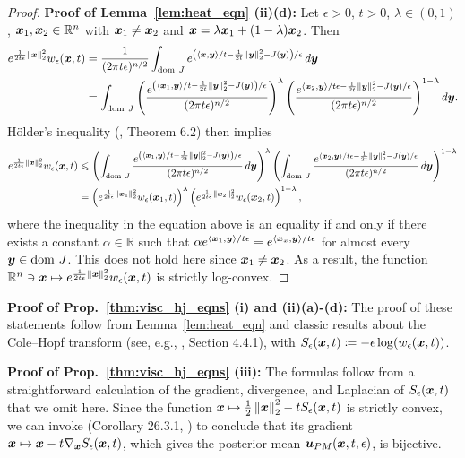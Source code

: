 \begin{proof}
\textbf{Proof of Lemma~\ref{lem:heat_eqn} (ii)(d):} Let $\epsilon>0$, $t>0$, $\lambda\in(0,1)$, $\boldsymbol{x}_1,\boldsymbol{x}_2\in \mathbb{R}^n$ with $\boldsymbol{x}_1\neq\boldsymbol{x}_2$ and $\boldsymbol{x}=\lambda\boldsymbol{x}_{1}+(1-\lambda)\boldsymbol{x}_{2}$. Then
\begin{align*}
    e^{\frac{1}{2t\epsilon}\left\Vert{\boldsymbol{x}} \right\Vert_{2}^{2}}w_\epsilon(\boldsymbol{x},t) &= \frac{1}{(2\pi t\epsilon)^{n/2}}\int_{\mathrm{dom~} J} e^{\left(\left\langle \boldsymbol{x},\boldsymbol{y}\right\rangle/t -\frac{1}{2t}\left\Vert{\boldsymbol{y}} \right\Vert_{2}^{2} - J(\boldsymbol{y})\right)/\epsilon}\mathop{}\!d\boldsymbol{y} \\
    &=\int_{\mathrm{dom~} J} \left(\frac{e^{\left(\left\langle \boldsymbol{x}_1,\boldsymbol{y}\right\rangle/t-\frac{1}{2t}\left\Vert{\boldsymbol{y}} \right\Vert_{2}^{2} - J(\boldsymbol{y})\right)/\epsilon}}{(2\pi t \epsilon)^{n/2}}\right)^\lambda \left(\frac{e^{\left\langle \boldsymbol{x}_2,\boldsymbol{y}\right\rangle/t\epsilon-\frac{1}{2t}\left\Vert{\boldsymbol{y}} \right\Vert_{2}^{2} - J(\boldsymbol{y})/\epsilon}}{(2\pi t \epsilon)^{n/2}}\right)^{1-\lambda} \mathop{}\!d\boldsymbol{y}.
\end{align*}
H\"older's inequality (\citep{folland2013real}, Theorem 6.2) then implies
\begin{align*}
    e^{\frac{1}{2t\epsilon}\left\Vert{\boldsymbol{x}} \right\Vert_{2}^{2}}w_\epsilon(\boldsymbol{x},t) &\leqslant \left(\int_{\mathrm{dom~} J} \frac{e^{\left(\left\langle \boldsymbol{x}_1,\boldsymbol{y}\right\rangle/t-\frac{1}{2t}\left\Vert{\boldsymbol{y}} \right\Vert_{2}^{2} - J(\boldsymbol{y})\right)/\epsilon}}{(2\pi t \epsilon)^{n/2}} \mathop{}\!d\boldsymbol{y}\right)^\lambda \left(\int_{\mathrm{dom~} J}  \frac{e^{\left\langle \boldsymbol{x}_2,\boldsymbol{y}\right\rangle/t\epsilon-\frac{1}{2t}\left\Vert{\boldsymbol{y}} \right\Vert_{2}^{2} - J(\boldsymbol{y})/\epsilon}}{(2\pi t \epsilon)^{n/2}} \mathop{}\!d\boldsymbol{y} \right)^{1-\lambda} \\
    &=\left(e^{\frac{1}{2t\epsilon}\left\Vert{\boldsymbol{x}_1} \right\Vert_{2}^{2}}w_\epsilon(\boldsymbol{x}_1,t)\right)^\lambda \left(e^{\frac{1}{2t\epsilon}\left\Vert{\boldsymbol{x}_2} \right\Vert_{2}^{2}}w_\epsilon(\boldsymbol{x}_2,t)\right)^{1-\lambda},
\end{align*}
where the inequality in the equation above is an equality if and only if there exists a constant $\alpha \in \mathbb{R}$ such that $\alpha e^{\left\langle \boldsymbol{x}_1,\boldsymbol{y}\right\rangle/t\epsilon} = e^{\left\langle \boldsymbol{x}_x,\boldsymbol{y}\right\rangle/t\epsilon}$
for almost every $\boldsymbol{y} \in \mathrm{dom~} J$. This does not hold here since $\boldsymbol{x}_1\neq\boldsymbol{x}_2$. As a result, the function $\mathbb{R}^n\ni\boldsymbol{x}\mapsto e^{\frac{1}{2t\epsilon}\left\Vert{\boldsymbol{x}} \right\Vert_{2}^{2}}w_{\epsilon}(\boldsymbol{x},t)$ is strictly log-convex.
\end{proof}


\textbf{Proof of Prop.~\ref{thm:visc_hj_eqns} (i) and (ii)(a)-(d):} The proof of these statements follow from Lemma~\ref{lem:heat_eqn} and classic results about the Cole--Hopf transform (see, e.g., \citep{evans1998partial}, Section 4.4.1), with $S_\epsilon(\boldsymbol{x},t) \coloneqq -\epsilon\log(w_\epsilon(\boldsymbol{x},t))$.

\textbf{Proof of Prop.~\ref{thm:visc_hj_eqns} (iii):} The formulas follow from a straightforward calculation of the gradient, divergence, and Laplacian of $S_\epsilon(\boldsymbol{x},t)$ that we omit here. Since the function $\boldsymbol{x} \mapsto \frac{1}{2}\left\Vert{\boldsymbol{x}} \right\Vert_{2}^{2}-tS_{\epsilon}(\boldsymbol{x},t)$ is strictly convex, we can invoke (Corollary 26.3.1, \cite{rockafellar1970convex}) to conclude that its gradient $\boldsymbol{x} \mapsto \boldsymbol{x} - t\nabla_{\boldsymbol{x}}S_\epsilon(\boldsymbol{x},t)$, which gives the posterior mean $\boldsymbol{u}_{PM}(\boldsymbol{x},t,\epsilon)$, is bijective.

